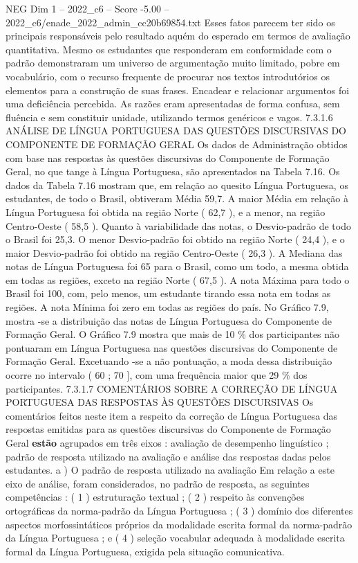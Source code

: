 \begin{textsample}{NEG Dim 1 – 2022\_c6 – Score -5.00 – 2022\_c6/enade\_2022\_admin\_cc20b69854.txt}
Esses fatos parecem ter sido os principais responsáveis pelo resultado aquém do esperado em termos de avaliação quantitativa.
Mesmo os estudantes que responderam em conformidade com o padrão demonstraram um universo de argumentação muito limitado, pobre em vocabulário, com o recurso frequente de procurar nos textos introdutórios os elementos para a construção de suas frases.
Encadear e relacionar argumentos foi uma deficiência percebida.
As razões eram apresentadas de forma confusa, sem fluência e sem constituir unidade, utilizando termos genéricos e vagos. 7.3.1.6 ANÁLISE DE LÍNGUA PORTUGUESA DAS QUESTÕES DISCURSIVAS DO COMPONENTE DE FORMAÇÃO GERAL Os dados de Administração obtidos com base nas respostas às questões discursivas do Componente de Formação Geral, no que tange à Língua Portuguesa, são apresentados na Tabela 7.16.
Os dados da Tabela 7.16 mostram que, em relação ao quesito Língua Portuguesa, os estudantes, de todo o Brasil, obtiveram Média 59,7.
A maior Média em relação à Língua Portuguesa foi obtida na região Norte ( 62,7 ), e a menor, na região Centro-Oeste ( 58,5 ).
Quanto à variabilidade das notas, o Desvio-padrão de todo o Brasil foi 25,3.
O menor Desvio-padrão foi obtido na região Norte ( 24,4 ), e o maior Desvio-padrão foi obtido na região Centro-Oeste ( 26,3 ).
A Mediana das notas de Língua Portuguesa foi 65 para o Brasil, como um todo, a mesma obtida em todas as regiões, exceto na região Norte ( 67,5 ).
A nota Máxima para todo o Brasil foi 100, com, pelo menos, um estudante tirando essa nota em todas as regiões.
A nota Mínima foi zero em todas as regiões do país.
No Gráfico 7.9, mostra -se a distribuição das notas de Língua Portuguesa do Componente de Formação Geral.
O Gráfico 7.9 mostra que mais de 10 \% dos participantes não pontuaram em Língua Portuguesa nas questões discursivas do Componente de Formação Geral.
Excetuando -se a não pontuação, a moda dessa distribuição ocorre no intervalo ( 60 ; 70 ], com uma frequência maior que 29 \% dos participantes. 7.3.1.7 COMENTÁRIOS SOBRE A CORREÇÃO DE LÍNGUA PORTUGUESA DAS RESPOSTAS ÀS QUESTÕES DISCURSIVAS Os comentários feitos neste item a respeito da correção de Língua Portuguesa das respostas emitidas para as questões discursivas do Componente de Formação Geral \textbf{estão} agrupados em três eixos : avaliação de desempenho linguístico ; padrão de resposta utilizado na avaliação e análise das respostas dadas pelos estudantes. a ) O padrão de resposta utilizado na avaliação Em relação a este eixo de análise, foram considerados, no padrão de resposta, as seguintes competências : ( 1 ) estruturação textual ; ( 2 ) respeito às convenções ortográficas da norma-padrão da Língua Portuguesa ; ( 3 ) domínio dos diferentes aspectos morfossintáticos próprios da modalidade escrita formal da norma-padrão da Língua Portuguesa ; e ( 4 ) seleção vocabular adequada à modalidade escrita formal da Língua Portuguesa, exigida pela situação comunicativa.

\end{textsample}
